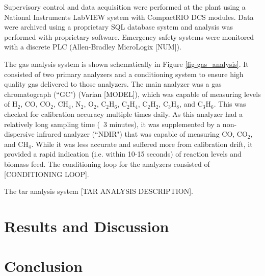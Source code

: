 \documentclass[11pt,twocolumn]{article}
\begin{document}
Supervisory control and data acquisition were performed at the plant using a National Instruments LabVIEW system with CompactRIO DCS modules.  Data were archived using a proprietary SQL database system and analysis was performed with proprietary software.  Emergency safety systems were monitored with a discrete PLC (Allen-Bradley MicroLogix [NUM]).

The gas analysis system is shown schematically in Figure \ref{fig-gas_analysis}.  It consisted of two primary analyzers and a conditioning system to ensure high quality gas delivered to those analyzers.  The main analyzer was a gas chromatograph (``GC") (Varian [MODEL]), which was capable of measuring levels of H$_2$, CO, CO$_2$, CH$_4$, N$_2$, O$_2$, C$_2$H$_6$, C$_2$H$_4$, C$_2$H$_2$, C$_3$H$_8$, and C$_3$H$_6$.  This was checked for calibration accuracy multiple times daily.  As this analyzer had a relatively long sampling time (~3 minutes), it was supplemented by a non-dispersive infrared analyzer (``NDIR") that was capable of measuring CO, CO$_2$, and CH$_4$.  While it was less accurate and suffered more from calibration drift, it provided a rapid indication (i.e. within 10-15 seconds) of reaction levels and biomass feed.  The conditioning loop for the analyzers consisted of [CONDITIONING LOOP].

The tar analysis system [TAR ANALYSIS DESCRIPTION].




\section*{Results and Discussion}



\section*{Conclusion}



\newpage
\appendix
\onecolumn
\end{document}
